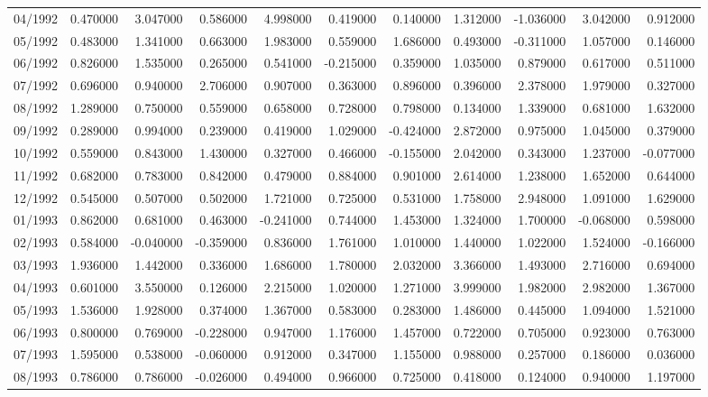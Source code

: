 \begin{tabular}{lrrrrrrrrrr}
04/1992 & 0.470000 & 3.047000 & 0.586000 & 4.998000 & 0.419000 & 0.140000 & 1.312000 & -1.036000 & 3.042000 & 0.912000 \\
05/1992 & 0.483000 & 1.341000 & 0.663000 & 1.983000 & 0.559000 & 1.686000 & 0.493000 & -0.311000 & 1.057000 & 0.146000 \\
06/1992 & 0.826000 & 1.535000 & 0.265000 & 0.541000 & -0.215000 & 0.359000 & 1.035000 & 0.879000 & 0.617000 & 0.511000 \\
07/1992 & 0.696000 & 0.940000 & 2.706000 & 0.907000 & 0.363000 & 0.896000 & 0.396000 & 2.378000 & 1.979000 & 0.327000 \\
08/1992 & 1.289000 & 0.750000 & 0.559000 & 0.658000 & 0.728000 & 0.798000 & 0.134000 & 1.339000 & 0.681000 & 1.632000 \\
09/1992 & 0.289000 & 0.994000 & 0.239000 & 0.419000 & 1.029000 & -0.424000 & 2.872000 & 0.975000 & 1.045000 & 0.379000 \\
10/1992 & 0.559000 & 0.843000 & 1.430000 & 0.327000 & 0.466000 & -0.155000 & 2.042000 & 0.343000 & 1.237000 & -0.077000 \\
11/1992 & 0.682000 & 0.783000 & 0.842000 & 0.479000 & 0.884000 & 0.901000 & 2.614000 & 1.238000 & 1.652000 & 0.644000 \\
12/1992 & 0.545000 & 0.507000 & 0.502000 & 1.721000 & 0.725000 & 0.531000 & 1.758000 & 2.948000 & 1.091000 & 1.629000 \\
01/1993 & 0.862000 & 0.681000 & 0.463000 & -0.241000 & 0.744000 & 1.453000 & 1.324000 & 1.700000 & -0.068000 & 0.598000 \\
02/1993 & 0.584000 & -0.040000 & -0.359000 & 0.836000 & 1.761000 & 1.010000 & 1.440000 & 1.022000 & 1.524000 & -0.166000 \\
03/1993 & 1.936000 & 1.442000 & 0.336000 & 1.686000 & 1.780000 & 2.032000 & 3.366000 & 1.493000 & 2.716000 & 0.694000 \\
04/1993 & 0.601000 & 3.550000 & 0.126000 & 2.215000 & 1.020000 & 1.271000 & 3.999000 & 1.982000 & 2.982000 & 1.367000 \\
05/1993 & 1.536000 & 1.928000 & 0.374000 & 1.367000 & 0.583000 & 0.283000 & 1.486000 & 0.445000 & 1.094000 & 1.521000 \\
06/1993 & 0.800000 & 0.769000 & -0.228000 & 0.947000 & 1.176000 & 1.457000 & 0.722000 & 0.705000 & 0.923000 & 0.763000 \\
07/1993 & 1.595000 & 0.538000 & -0.060000 & 0.912000 & 0.347000 & 1.155000 & 0.988000 & 0.257000 & 0.186000 & 0.036000 \\
08/1993 & 0.786000 & 0.786000 & -0.026000 & 0.494000 & 0.966000 & 0.725000 & 0.418000 & 0.124000 & 0.940000 & 1.197000 \\

\end{tabular}

